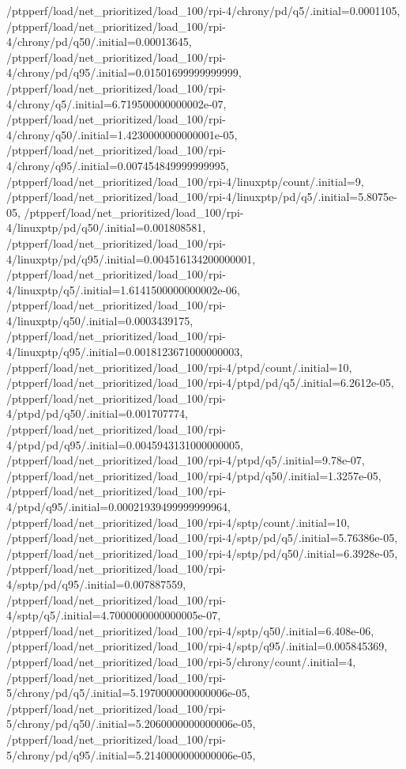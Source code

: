{    /ptpperf/load/net_prioritized/load_100/rpi-4/chrony/pd/q5/.initial=0.0001105,
    /ptpperf/load/net_prioritized/load_100/rpi-4/chrony/pd/q50/.initial=0.00013645,
    /ptpperf/load/net_prioritized/load_100/rpi-4/chrony/pd/q95/.initial=0.01501699999999999,
    /ptpperf/load/net_prioritized/load_100/rpi-4/chrony/q5/.initial=6.719500000000002e-07,
    /ptpperf/load/net_prioritized/load_100/rpi-4/chrony/q50/.initial=1.4230000000000001e-05,
    /ptpperf/load/net_prioritized/load_100/rpi-4/chrony/q95/.initial=0.007454849999999995,
    /ptpperf/load/net_prioritized/load_100/rpi-4/linuxptp/count/.initial=9,
    /ptpperf/load/net_prioritized/load_100/rpi-4/linuxptp/pd/q5/.initial=5.8075e-05,
    /ptpperf/load/net_prioritized/load_100/rpi-4/linuxptp/pd/q50/.initial=0.001808581,
    /ptpperf/load/net_prioritized/load_100/rpi-4/linuxptp/pd/q95/.initial=0.004516134200000001,
    /ptpperf/load/net_prioritized/load_100/rpi-4/linuxptp/q5/.initial=1.6141500000000002e-06,
    /ptpperf/load/net_prioritized/load_100/rpi-4/linuxptp/q50/.initial=0.0003439175,
    /ptpperf/load/net_prioritized/load_100/rpi-4/linuxptp/q95/.initial=0.0018123671000000003,
    /ptpperf/load/net_prioritized/load_100/rpi-4/ptpd/count/.initial=10,
    /ptpperf/load/net_prioritized/load_100/rpi-4/ptpd/pd/q5/.initial=6.2612e-05,
    /ptpperf/load/net_prioritized/load_100/rpi-4/ptpd/pd/q50/.initial=0.001707774,
    /ptpperf/load/net_prioritized/load_100/rpi-4/ptpd/pd/q95/.initial=0.0045943131000000005,
    /ptpperf/load/net_prioritized/load_100/rpi-4/ptpd/q5/.initial=9.78e-07,
    /ptpperf/load/net_prioritized/load_100/rpi-4/ptpd/q50/.initial=1.3257e-05,
    /ptpperf/load/net_prioritized/load_100/rpi-4/ptpd/q95/.initial=0.00021939499999999964,
    /ptpperf/load/net_prioritized/load_100/rpi-4/sptp/count/.initial=10,
    /ptpperf/load/net_prioritized/load_100/rpi-4/sptp/pd/q5/.initial=5.76386e-05,
    /ptpperf/load/net_prioritized/load_100/rpi-4/sptp/pd/q50/.initial=6.3928e-05,
    /ptpperf/load/net_prioritized/load_100/rpi-4/sptp/pd/q95/.initial=0.007887559,
    /ptpperf/load/net_prioritized/load_100/rpi-4/sptp/q5/.initial=4.7000000000000005e-07,
    /ptpperf/load/net_prioritized/load_100/rpi-4/sptp/q50/.initial=6.408e-06,
    /ptpperf/load/net_prioritized/load_100/rpi-4/sptp/q95/.initial=0.005845369,
    /ptpperf/load/net_prioritized/load_100/rpi-5/chrony/count/.initial=4,
    /ptpperf/load/net_prioritized/load_100/rpi-5/chrony/pd/q5/.initial=5.1970000000000006e-05,
    /ptpperf/load/net_prioritized/load_100/rpi-5/chrony/pd/q50/.initial=5.2060000000000006e-05,
    /ptpperf/load/net_prioritized/load_100/rpi-5/chrony/pd/q95/.initial=5.2140000000000006e-05,
}
